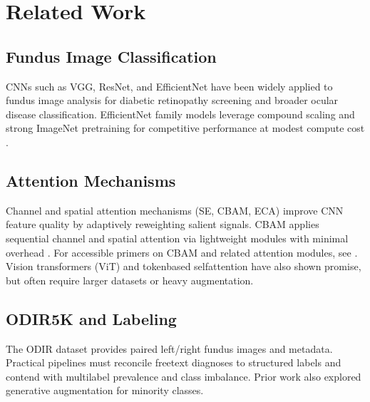 \chapter{Related Work}
\section{Fundus Image Classification}
CNNs such as VGG, ResNet, and EfficientNet have been widely applied to fundus image analysis for diabetic retinopathy screening and broader ocular disease classification. EfficientNet family models leverage compound scaling and strong ImageNet pretraining for competitive performance at modest compute cost \cite{tan2019efficientnet}.

\section{Attention Mechanisms}
Channel and spatial attention mechanisms (SE, CBAM, ECA) improve CNN feature quality by adaptively reweighting salient signals. CBAM applies sequential channel and spatial attention via lightweight modules with minimal overhead \cite{woo2018cbam}. For accessible primers on CBAM and related attention modules, see \cite{cbamMedium, cbamDO}. Vision transformers (ViT) and token\textendash based self\textendash attention have also shown promise, but often require larger datasets or heavy augmentation.

\section{ODIR\textendash 5K and Labeling}
The ODIR dataset provides paired left/right fundus images and metadata. Practical pipelines must reconcile free\textendash text diagnoses to structured labels and contend with multi\textendash label prevalence and class imbalance. Prior work also explored generative augmentation for minority classes.

